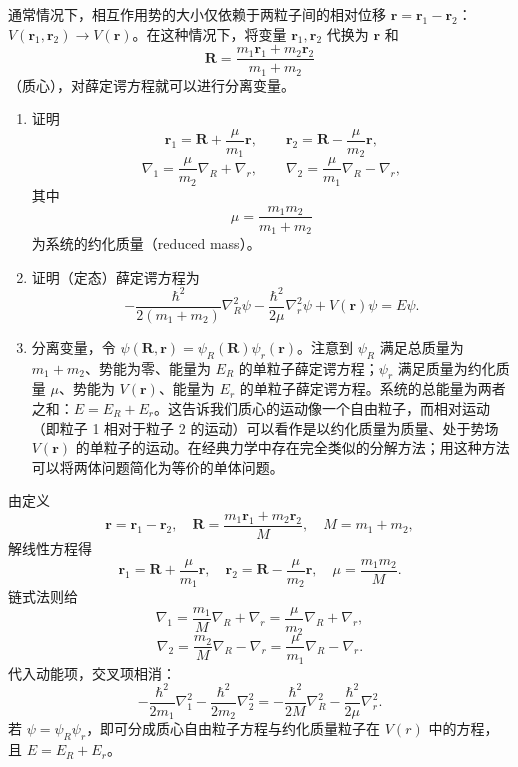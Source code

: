 \begin{question}
通常情况下，相互作用势的大小仅依赖于两粒子间的相对位移 $\mathbf r=\mathbf r_1-\mathbf r_2$：$V(\mathbf r_1,\mathbf r_2)\to V(\mathbf r)$。在这种情况下，将变量 $\mathbf r_1,\mathbf r_2$ 代换为 $\mathbf r$ 和
\[
\mathbf R=\frac{m_1\mathbf r_1+m_2\mathbf r_2}{m_1+m_2}
\]
（质心），对薛定谔方程就可以进行分离变量。
\begin{enumerate}
\item 证明
\[
\mathbf r_1=\mathbf R+\frac{\mu}{m_1}\mathbf r,\qquad
\mathbf r_2=\mathbf R-\frac{\mu}{m_2}\mathbf r,
\]
\[
\nabla_1=\frac{\mu}{m_2}\nabla_R+\nabla_r,\qquad
\nabla_2=\frac{\mu}{m_1}\nabla_R-\nabla_r,
\]
其中
\[
\mu=\frac{m_1m_2}{m_1+m_2}
\]
为系统的约化质量（reduced mass）。
\item 证明（定态）薛定谔方程为
\[
-\frac{\hbar^2}{2(m_1+m_2)}\nabla_R^2\psi
-\frac{\hbar^2}{2\mu}\nabla_r^2\psi+V(\mathbf r)\psi=E\psi.
\]
\item 分离变量，令 $\psi(\mathbf R,\mathbf r)=\psi_R(\mathbf R)\psi_r(\mathbf r)$。注意到 $\psi_R$ 满足总质量为 $m_1+m_2$、势能为零、能量为 $E_R$ 的单粒子薛定谔方程；$\psi_r$ 满足质量为约化质量 $\mu$、势能为 $V(\mathbf r)$、能量为 $E_r$ 的单粒子薛定谔方程。系统的总能量为两者之和：$E=E_R+E_r$。这告诉我们质心的运动像一个自由粒子，而相对运动（即粒子 1 相对于粒子 2 的运动）可以看作是以约化质量为质量、处于势场 $V(\mathbf r)$ 的单粒子的运动。在经典力学中存在完全类似的分解方法；用这种方法可以将两体问题简化为等价的单体问题。
\end{enumerate}
\end{question}
\begin{solution}

由定义
\[
\mathbf r=\mathbf r_1-\mathbf r_2,
\quad
\mathbf R=\frac{m_1\mathbf r_1+m_2\mathbf r_2}{M},\quad M=m_1+m_2,
\]
解线性方程得
\[
\mathbf r_1=\mathbf R+\frac{\mu}{m_1}\mathbf r,
\quad
\mathbf r_2=\mathbf R-\frac{\mu}{m_2}\mathbf r,
\quad \mu=\frac{m_1m_2}{M}.
\]
链式法则给
\[
\nabla_1=\frac{m_1}{M}\nabla_R+\nabla_r=\frac{\mu}{m_2}\nabla_R+\nabla_r,
\]
\[
\nabla_2=\frac{m_2}{M}\nabla_R-\nabla_r=\frac{\mu}{m_1}\nabla_R-\nabla_r.
\]
代入动能项，交叉项相消：
\[
-\frac{\hbar^2}{2m_1}\nabla_1^2-\frac{\hbar^2}{2m_2}\nabla_2^2
=-\frac{\hbar^2}{2M}\nabla_R^2-\frac{\hbar^2}{2\mu}\nabla_r^2.
\]
若 $\psi=\psi_R\psi_r$，即可分成质心自由粒子方程与约化质量粒子在 $V(r)$ 中的方程，且 $E=E_R+E_r$。

\end{solution}


